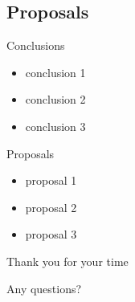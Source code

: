 \subsection{Proposals} 
\begin{frame}{\subsecname}

	\begin{block}{Conclusions}
		\begin{itemize}
		\item conclusion 1
		\item conclusion 2
		\item conclusion 3
		\end{itemize}
	\end{block}

	\begin{exampleblock}{Proposals}
		\begin{itemize}
		\item proposal 1
		\item proposal 2
		\item proposal 3
		\end{itemize}
	\end{exampleblock}
\end{frame}



\begin{nosidebarframe}

\centering

\color{blue}
\huge Thank you for your time 

\vskip 2cm

\huge Any questions?

\end{nosidebarframe}

